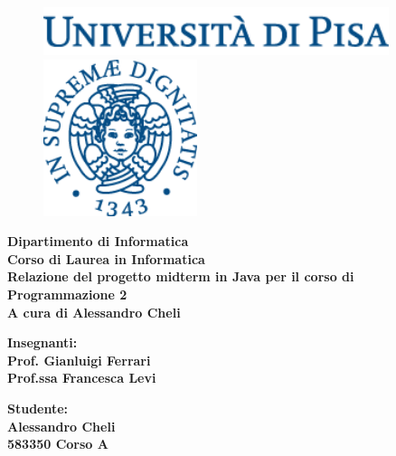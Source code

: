 \documentclass[12pt]{report}
\begin{document}
\begin{titlepage}
\begin{figure}[t]
	\centering\includegraphics[width=0.9\textwidth]{scritta}
    \centering\includegraphics[width=0.4\textwidth]{logo}
\end{figure}

\begin{center}
	\textbf{ Dipartimento di Informatica\\ Corso di Laurea in Informatica\\}
	\vspace{15mm}
    {\LARGE{\bf Relazione del progetto midterm in Java per il corso di Programmazione 2}}\\
	\vspace{3mm}
	{\LARGE{\bf A cura di Alessandro Cheli}}\\
\end{center}

\vspace{18mm}

\begin{minipage}[t]{0.47\textwidth}
	{\large{\bf Insegnanti:\\ Prof. Gianluigi Ferrari\\ Prof.ssa Francesca Levi}}
\end{minipage}\hfill\begin{minipage}[t]{0.47\textwidth}\raggedleft
	{\large{\bf Studente: \\Alessandro Cheli \\ 583350 Corso A\\ }}
\end{minipage}

\vspace{18mm}


\end{titlepage}
\end{document}
